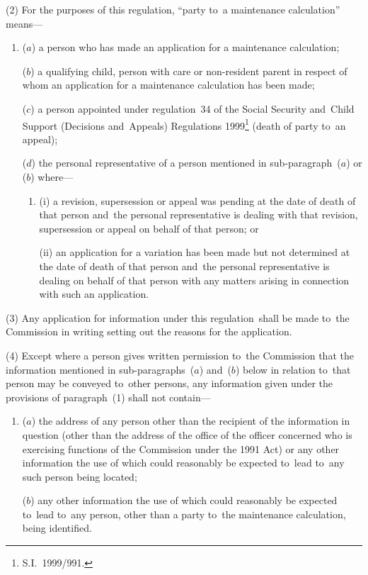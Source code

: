 \documentclass[12pt,a4paper]{article}
\begin{document}
(2) For the purposes of this regulation, “party to~a maintenance calculation” means—
\begin{enumerate}\item[]
($a$) a person who has made an application for a maintenance calculation;

($b$) a qualifying child, person with care or non-resident parent in respect of whom an application for a maintenance calculation has been made;

($c$) a person appointed under regulation~34 of the Social Security and~Child Support (Decisions and~Appeals) Regulations 1999\footnote{S.I.~1999/991.} (death of party to~an appeal);

($d$) the personal representative of a person mentioned in sub-paragraph~($a$)  or ($b$)  where—
\begin{enumerate}\item[]
(i) a revision, supersession or appeal was pending at the date of death of that person and~the personal representative is dealing with that revision, supersession or appeal on behalf of that person; or

(ii) an application for a variation has been made but not determined at the date of death of that person and~the personal representative is dealing on behalf of that person with any matters arising in connection with such an application.
\end{enumerate}
\end{enumerate}

(3) Any application for information under this regulation~shall be made to~the Commission in writing setting out the reasons for the application.

(4) Except where a person gives written permission to~the Commission that the information mentioned in sub-paragraphs~($a$)  and~($b$)  below in relation to~that person may be conveyed to~other persons, any information given under the provisions of paragraph~(1) shall not contain—
\begin{enumerate}\item[]
($a$) the address of any person other than the recipient of the information in question (other than the address of the office of the officer concerned who is exercising functions of the Commission under the 1991 Act) or any other information the use of which could reasonably be expected to~lead to~any such person being located;

($b$) any other information the use of which could reasonably be expected to~lead to~any person, other than a party to~the maintenance calculation, being identified.
\end{enumerate}
\end{document}
